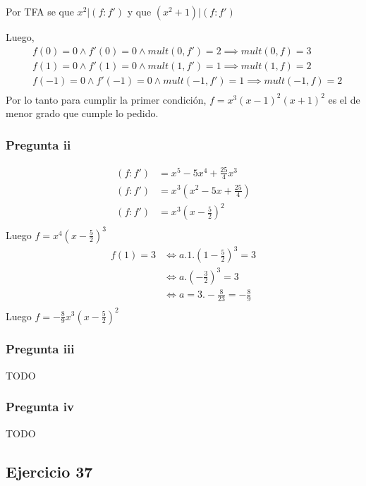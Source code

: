Por TFA se que $ x^2|(f:f') $ y que $ (x^2+1) | (f:f') $

Luego,
\begin{align*}
    &f(0) = 0 \wedge f'(0) = 0 \wedge mult(0,f') = 2 \implies mult(0,f) = 3 \\
    &f(1) = 0 \wedge f'(1) = 0 \wedge mult(1,f') = 1 \implies mult(1,f) = 2 \\
    &f(-1) = 0 \wedge f'(-1) = 0 \wedge mult(-1,f') = 1 \implies mult(-1,f) = 2 \\
\end{align*}
Por lo tanto para cumplir la primer condición, $ f = x^3(x-1)^2(x+1)^2 $ es el de menor grado que cumple lo pedido.

\subsubsection{Pregunta ii}

\begin{align*}
    (f:f') &= x^5-5x^4+\frac{25}{4}x^3 \\
    (f:f') &= x^3(x^2-5x+\frac{25}{4}) \\
    (f:f') &= x^3(x-\frac{5}{2})^2 \\
\end{align*}
Luego $ f = x^4(x-\frac{5}{2})^3 $
\begin{align*}
    f(1) = 3 &\iff a.1.(1-\frac{5}{2})^3 = 3 \\
    &\iff a.(-\frac{3}{2})^3 = 3 \\
    &\iff a = 3. -\frac{8}{23} = -\frac{8}{9} \\
\end{align*}
Luego $ f = -\frac{8}{9}x^3(x-\frac{5}{2})^2 $

\subsubsection{Pregunta iii}
TODO

\subsubsection{Pregunta iv}
TODO

\subsection{Ejercicio 37}

